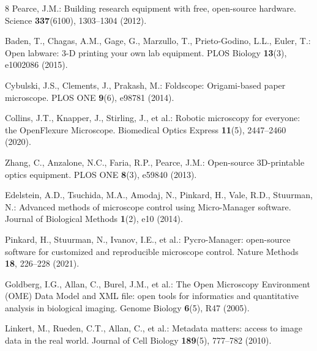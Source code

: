 \documentclass[runningheads]{llncs}
\begin{document}
%
%
%
% 
% 
%
\begin{thebibliography}{8}
Pearce, J.M.: Building research equipment with free, open-source hardware. Science \textbf{337}(6100), 1303--1304 (2012). 

Baden, T., Chagas, A.M., Gage, G., Marzullo, T., Prieto-Godino, L.L., Euler, T.: Open labware: 3-D printing your own lab equipment. PLOS Biology \textbf{13}(3), e1002086 (2015). 

Cybulski, J.S., Clements, J., Prakash, M.: Foldscope: Origami-based paper microscope. PLOS ONE \textbf{9}(6), e98781 (2014). 

Collins, J.T., Knapper, J., Stirling, J., et al.: Robotic microscopy for everyone: the OpenFlexure Microscope. Biomedical Optics Express \textbf{11}(5), 2447--2460 (2020). 

Zhang, C., Anzalone, N.C., Faria, R.P., Pearce, J.M.: Open-source 3D-printable optics equipment. PLOS ONE \textbf{8}(3), e59840 (2013). 

Edelstein, A.D., Tsuchida, M.A., Amodaj, N., Pinkard, H., Vale, R.D., Stuurman, N.: Advanced methods of microscope control using Micro-Manager software. Journal of Biological Methods \textbf{1}(2), e10 (2014). 

Pinkard, H., Stuurman, N., Ivanov, I.E., et al.: Pycro-Manager: open-source software for customized and reproducible microscope control. Nature Methods \textbf{18}, 226--228 (2021). 

Goldberg, I.G., Allan, C., Burel, J.M., et al.: The Open Microscopy Environment (OME) Data Model and XML file: open tools for informatics and quantitative analysis in biological imaging. Genome Biology \textbf{6}(5), R47 (2005). 

Linkert, M., Rueden, C.T., Allan, C., et al.: Metadata matters: access to image data in the real world. Journal of Cell Biology \textbf{189}(5), 777--782 (2010). 


\end{thebibliography}
\end{document}
